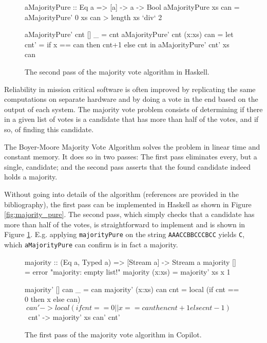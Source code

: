 \documentclass[]{article}
\theoremstyle{example}
\begin{document}
\begin{figure}
\begin{code}
aMajorityPure :: Eq a => [a] -> a -> Bool
aMajorityPure xs can = aMajorityPure' 0 xs can > length xs `div` 2

aMajorityPure' cnt []     _   = cnt
aMajorityPure' cnt (x:xs) can =
  let
    cnt' = if x == can then cnt+1 else cnt
  in
    aMajorityPure' cnt' xs can
\end{code}
\caption{The second pass of the majority vote algorithm in Haskell.}
\label{fig:amajority_pure}
\end{figure}

Reliability in mission critical software is often improved by replicating
the same computations on separate hardware and by doing a vote in the end
based on the output of each system. The majority vote problem consists of
determining if there in a given list of votes is a candidate that has more
than half of the votes, and if so, of finding this candidate.

The Boyer-Moore Majority Vote Algorithm \cite{MooreBoyer82, Hesselink2005}
solves the problem in linear time and constant memory. It does so in two passes:
The first pass eliminates every, but a single, candidate; and the second pass
asserts that the found candidate indeed holds a majority.

Without going into details of the algorithm (references are provided in the
bibliography), the first pass can be implemented in Haskell as shown in Figure
\ref{fig:majority_pure}. The second pass, which simply checks that a candidate
has more than half of the votes, is straightforward to implement and is shown
in Figure \ref{fig:amajority_pure}.
E.g. applying {\tt majorityPure} on the string {\tt AAACCBBCCCBCC} yields
{\tt C}, which {\tt aMajorityPure} can confirm is in fact a majority.

\begin{figure}[ht]
\begin{code}
majority :: (Eq a, Typed a) => [Stream a] -> Stream a
majority []     = error "majority: empty list!"
majority (x:xs) = majority' xs x 1

majority' []     can _   = can
majority' (x:xs) can cnt =
  local
    (if cnt == 0 then x else can) $
      \ can' ->
        local (if cnt == 0 || x == can then cnt+1 else cnt-1) $
          \ cnt' ->
            majority' xs can' cnt'
\end{code}
\caption{The first pass of the majority vote algorithm in Copilot.}
\label{fig:majority}
\end{figure}
\end{document}
